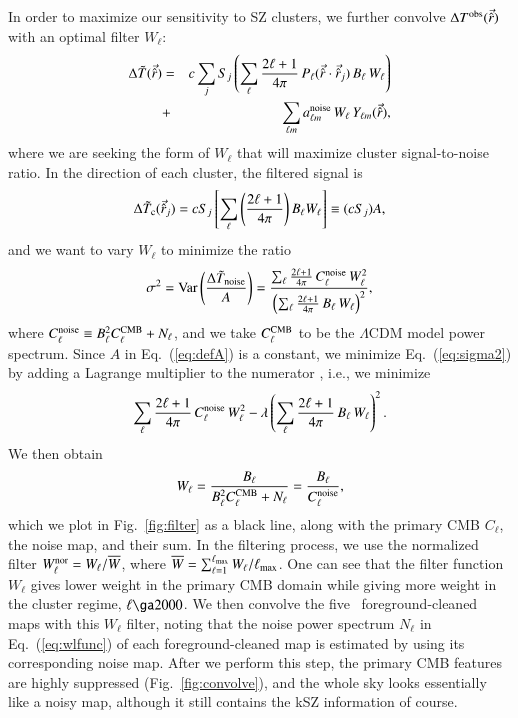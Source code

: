 \documentclass[traditabstract, longauth]{aa}
\newcommand{\1}{\'\i }
\begin{document}
In order to maximize our sensitivity to SZ clusters, we further convolve
$\Delta T^{\rm obs}(\vec{\hat{r}})$ with an optimal filter $W_{\ell}$:
\begin{eqnarray}
  \Delta \tilde{T}(\vec{\hat{r}}) & = & c \sum_{j} S_{j} \left(\sum_{\ell}
  \frac{2 \ell +1}{4\pi} \, P_{\ell}(\vec{\hat{r}} \cdot \vec{\hat{r}}_j)
  \, B_{\ell} \, W_{\ell} \right) \nonumber \\
  & + & \sum_{\ell m} a^{\rm noise}_{\ell m} \, W_{\ell} \, Y_{\ell
  m}(\vec{\hat{r}}),\label{eq:deltaT3}
\end{eqnarray}
where we are seeking the form of $W_{\ell}$ that will maximize cluster
signal-to-noise ratio. In the direction of each cluster, the filtered signal is
\begin{eqnarray}
  \Delta \tilde{T}_{\rm
  c}(\vec{\hat{r}}_{j})=cS_{j}\left[\sum_{\ell}\left(\frac{2 \ell +1}{4 \pi}
  \right)B_{\ell}W_{\ell} \right] \equiv (cS_{j})A, \label{eq:defA}
\end{eqnarray}
and we want to vary $W_{\ell}$ to minimize the ratio
\begin{equation}
\sigma^{2} = \textrm{Var} \left(\frac{\Delta
\tilde{T}_{\rm noise}}{\textit{A}} \right) = \frac{\sum_{\ell}
\frac{2 \ell +1}{4\pi} \, C^{\rm noise}_{\ell} \, W^2_{\ell}}{
\left(\sum_{\ell} \frac{2 \ell +1}{4\pi} \, B_{\ell} \, W_{\ell}
\right)^2}, \label{eq:sigma2}
\end{equation}
where $C^{\rm noise}_{\ell} \equiv B^2_{\ell} C^{\rm CMB}_{\ell} + N_{\ell}$, and
we take $C^{\rm CMB}_{\ell}$ to be the $\Lambda$CDM model power spectrum. Since
$A$ in Eq.~(\ref{eq:defA}) is a constant, we minimize Eq.~(\ref{eq:sigma2}) by
adding a Lagrange multiplier to the numerator \citep[see, e.g.,][]{Ma13}, i.e.,
we minimize
\begin{eqnarray}
 \sum_{\ell} \frac{2 \ell +1}{4\pi} \, C^{\rm
noise}_{\ell} \, W^2_{\ell} - \lambda \left(\sum_{\ell} \frac{2 \ell
+1}{4\pi} \, B_{\ell} \, W_{\ell} \right)^2.
\end{eqnarray}
We then obtain
\begin{eqnarray}
W_{\ell} =
\frac{B_{\ell}}{B^2_{\ell} C^{\rm CMB}_{\ell} + N_{\ell}} =
\frac{B_{\ell}}{C^{\rm noise}_{\ell}}, \label{eq:wlfunc}
\end{eqnarray}
which we plot in Fig.~\ref{fig:filter} as a black line,
along with the primary CMB $C_{\ell}$, the noise map, and their sum. In the filtering process, we use the normalized
filter $W^{\rm nor}_{\ell}=W_{\ell}/\overline{W}$, where $\overline{W}=\sum^{\ell_{\rm max}}_{\ell=1}W_{\ell}/\ell_{\rm max}$.
One can see that the filter function $W_{\ell}$ gives lower weight in the
primary CMB domain while giving more weight in the cluster regime,
$\ell\ga2000$. We then convolve the five \Planck\ foreground-cleaned maps with
this $W_{\ell}$ filter, noting that the noise power spectrum $N_{\ell}$ in
Eq.~(\ref{eq:wlfunc}) of each foreground-cleaned map is estimated by using its
corresponding noise map. After we perform this step, the primary CMB features
are highly suppressed (Fig.~\ref{fig:convolve}), and the whole sky looks
essentially like a noisy map, although it still contains the kSZ information of
course.
\end{document}
